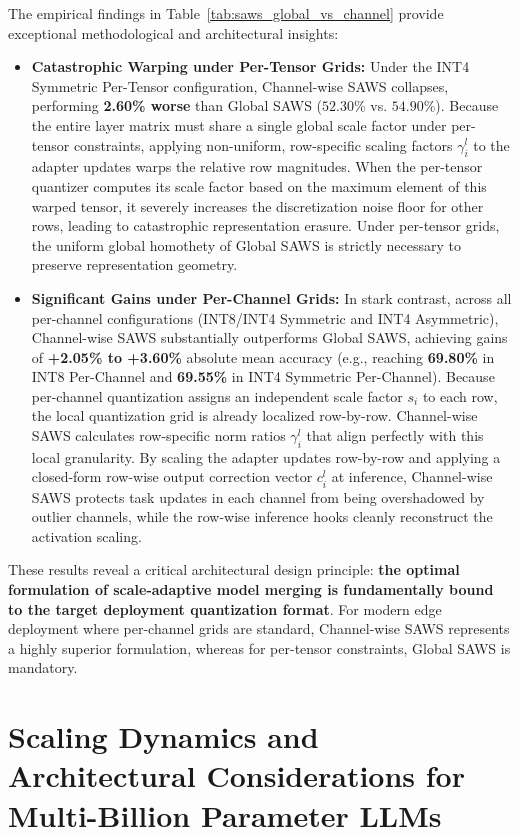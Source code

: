 \documentclass{article}
\theoremstyle{plain}
\theoremstyle{definition}
\theoremstyle{remark}
\begin{document}
The empirical findings in Table~\ref{tab:saws_global_vs_channel} provide exceptional methodological and architectural insights:
\begin{itemize}
  \item \textbf{Catastrophic Warping under Per-Tensor Grids:} Under the INT4 Symmetric Per-Tensor configuration, Channel-wise SAWS collapses, performing \textbf{2.60\% worse} than Global SAWS ($52.30\%$ vs. $54.90\%$). Because the entire layer matrix must share a single global scale factor under per-tensor constraints, applying non-uniform, row-specific scaling factors $\gamma^l_i$ to the adapter updates warps the relative row magnitudes. When the per-tensor quantizer computes its scale factor based on the maximum element of this warped tensor, it severely increases the discretization noise floor for other rows, leading to catastrophic representation erasure. Under per-tensor grids, the uniform global homothety of Global SAWS is strictly necessary to preserve representation geometry.
  \item \textbf{Significant Gains under Per-Channel Grids:} In stark contrast, across all per-channel configurations (INT8/INT4 Symmetric and INT4 Asymmetric), Channel-wise SAWS substantially outperforms Global SAWS, achieving gains of \textbf{+2.05\% to +3.60\%} absolute mean accuracy (e.g., reaching \textbf{69.80\%} in INT8 Per-Channel and \textbf{69.55\%} in INT4 Symmetric Per-Channel). Because per-channel quantization assigns an independent scale factor $s_i$ to each row, the local quantization grid is already localized row-by-row. Channel-wise SAWS calculates row-specific norm ratios $\gamma^l_i$ that align perfectly with this local granularity. By scaling the adapter updates row-by-row and applying a closed-form row-wise output correction vector $c^l_i$ at inference, Channel-wise SAWS protects task updates in each channel from being overshadowed by outlier channels, while the row-wise inference hooks cleanly reconstruct the activation scaling.
\end{itemize}

These results reveal a critical architectural design principle: \textbf{the optimal formulation of scale-adaptive model merging is fundamentally bound to the target deployment quantization format}. For modern edge deployment where per-channel grids are standard, Channel-wise SAWS represents a highly superior formulation, whereas for per-tensor constraints, Global SAWS is mandatory.

\section{Scaling Dynamics and Architectural Considerations for Multi-Billion Parameter LLMs}
\label{app:llm_scaling}
\end{document}
